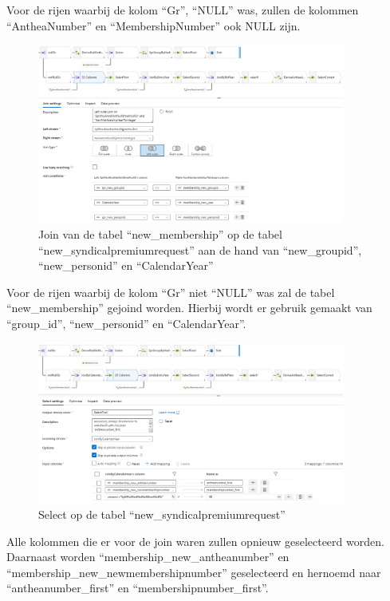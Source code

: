 Voor de rijen waarbij de kolom ``Gr'', ``NULL'' was, zullen de kolommen ``AntheaNumber'' en ``MembershipNumber'' ook NULL zijn.

\begin{figure}[H]
    \centering
    \includegraphics[width=0.9\textwidth]{./graphics/adf/member_3.png}
    \caption{Join van de tabel ``new\_membership'' op de tabel ``new\_syndicalpremiumrequest'' aan de hand van ``new\_groupid'', ``new\_personid'' en ``CalendarYear''}
\end{figure}

Voor de rijen waarbij de kolom ``Gr'' niet ``NULL'' was zal de tabel ``new\_membership'' gejoind worden. Hierbij wordt er gebruik gemaakt van ``group\_id'', ``new\_personid'' en ``CalendarYear''.

\begin{figure}[H]
    \centering
    \includegraphics[width=0.9\textwidth]{./graphics/adf/member_4.png}
    \caption{Select op de tabel ``new\_syndicalpremiumrequest''}
\end{figure}

Alle kolommen die er voor de join waren zullen opnieuw geselecteerd worden. Daarnaast worden ``membership\_new\_antheanumber'' en ``membership\_new\_newmembershipnumber'' geselecteerd en hernoemd naar ``antheanumber\_first'' en ``membershipnumber\_first''.

